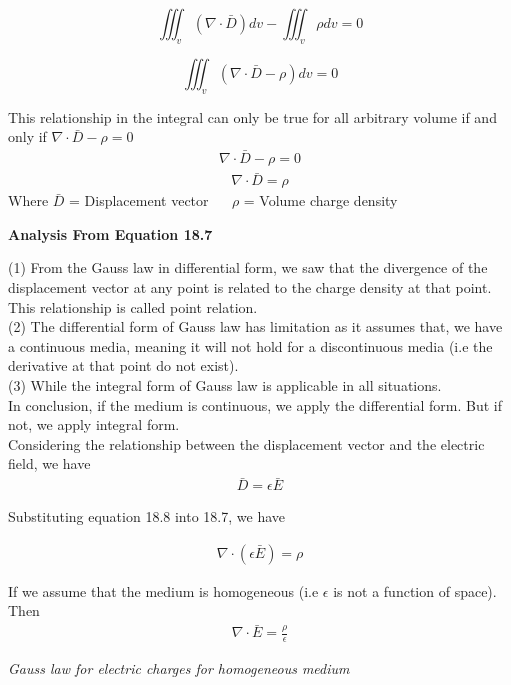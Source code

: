 \begin{equation*}
\iiint_v(\nabla\cdot \bar{D})dv - \iiint_v\rho dv = 0
\end{equation*}

\begin{equation*}
\iiint_v(\nabla\cdot \bar{D} - \rho)dv = 0
\end{equation*}

This relationship in the integral can only be
true for all arbitrary volume if and only if $\nabla\cdot\bar{D} - \rho = 0$
\begin{align*}
\nabla \cdot \bar{D} - \rho = 0
\end{align*}
\begin{align}
\boxed{\nabla \cdot \bar{D} = \rho}
\end{align}
Where $\bar{D}$ = Displacement vector $ \quad $
$\rho$ = Volume charge density\\

\begin{flushleft}
	\textbf{Analysis From Equation 18.7}
\end{flushleft}
(1) From the Gauss law in differential form, we saw that the divergence of the displacement vector at any point is related to the charge density at that point. This relationship is called point relation.\\
(2)	The differential form of Gauss law has limitation as it assumes that, we have a continuous media, meaning it will not hold for a discontinuous media (i.e the derivative at that point do not exist). \\
(3)	While the integral form of Gauss law is applicable in all situations.\\
In conclusion, if the medium is continuous, we apply the differential form. But if not, we apply integral form.\\

Considering the relationship between the displacement vector and the electric field, we have 
\begin{align}
\boxed{\bar{D} = \epsilon\bar{E}}
\end{align}

Substituting equation 18.8 into 18.7, we have

\begin{align*}
\nabla \cdot (\epsilon\bar{E}) = \rho
\end{align*}

If we assume that the medium is homogeneous (i.e $\epsilon$ is not a function of space). Then \\
\begin{align} 
\boxed{\nabla \cdot \bar{E} = \frac{\rho}{\epsilon}}
\end{align} 
\begin{center}
	\emph{Gauss law for electric charges for homogeneous medium}
\end{center} 


